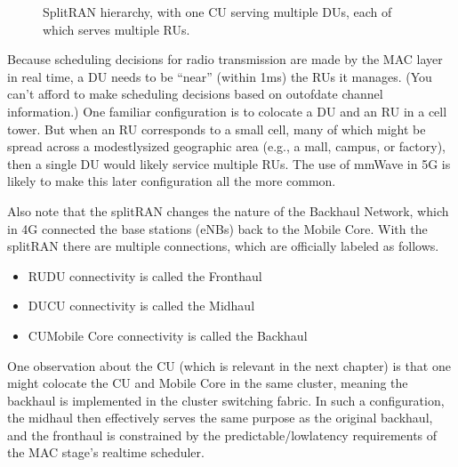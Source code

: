 \documentclass[a4paper,11pt,english]{sphinxmanual}
\let\sphinxpxdimen\pdfpxdimen\else\newdimen\sphinxpxdimen
\begin{document}
\begin{figure}[ht]
\centering
\capstart

\noindent\sphinxincludegraphics[width=400\sphinxpxdimen]{{Slide16}.png}
\caption{Split\sphinxhyphen{}RAN hierarchy, with one CU serving multiple DUs,
each of which serves multiple RUs.}\label{\detokenize{ran:id3}}\label{\detokenize{ran:fig-ran-hierarchy}}\end{figure}

\sphinxAtStartPar
Because scheduling decisions for radio transmission are made by the
MAC layer in real
time, a DU needs to be “near” (within 1ms) the RUs it manages. (You
can’t afford to make scheduling decisions based on out\sphinxhyphen{}of\sphinxhyphen{}date channel
information.) One familiar configuration is
to co\sphinxhyphen{}locate a DU and an RU in a cell tower. But when an RU corresponds
to a small cell, many of which might be spread across a modestly\sphinxhyphen{}sized
geographic area (e.g., a mall, campus, or factory), then a single DU
would likely service multiple RUs. The use of mmWave in 5G is likely to
make this later configuration all the more common.

\sphinxAtStartPar
Also note that the split\sphinxhyphen{}RAN changes the nature of the Backhaul Network,
which in 4G connected the base stations (eNBs) back to the Mobile Core.
With the split\sphinxhyphen{}RAN there are multiple connections, which are officially
labeled as follows.
\begin{itemize}
\item {} 
\sphinxAtStartPar
RU\sphinxhyphen{}DU connectivity is called the Fronthaul

\item {} 
\sphinxAtStartPar
DU\sphinxhyphen{}CU connectivity is called the Midhaul

\item {} 
\sphinxAtStartPar
CU\sphinxhyphen{}Mobile Core connectivity is called the Backhaul

\end{itemize}

\sphinxAtStartPar
One observation about the CU (which is relevant in the next chapter)
is that one might co\sphinxhyphen{}locate the CU and Mobile Core in the same
cluster, meaning the backhaul is implemented in the cluster switching
fabric. In such a configuration, the midhaul then effectively serves
the same purpose as the original backhaul, and the fronthaul is
constrained by the predictable/low\sphinxhyphen{}latency requirements of the MAC
stage’s real\sphinxhyphen{}time scheduler.
\end{document}
